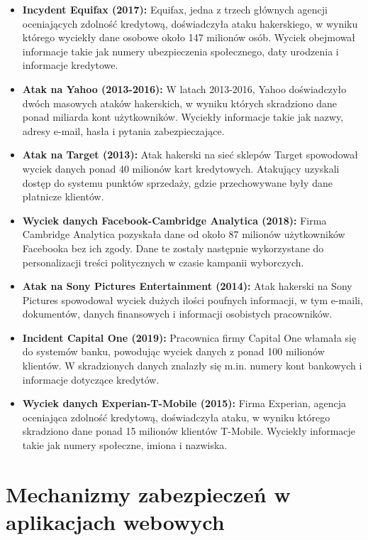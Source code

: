 \documentclass[12pt,twoside]{article}
\begin{document}
\begin{itemize}


\item \textbf{Incydent Equifax (2017):} Equifax, jedna z trzech głównych agencji oceniających zdolność kredytową, doświadczyła ataku hakerskiego, w wyniku którego wyciekły dane osobowe około 147 milionów osób. Wyciek obejmował informacje takie jak numery ubezpieczenia społecznego, daty urodzenia i informacje kredytowe.

\item \textbf{Atak na Yahoo (2013-2016):} W latach 2013-2016, Yahoo doświadczyło dwóch masowych ataków hakerskich, w wyniku których skradziono dane ponad miliarda kont użytkowników. Wyciekły informacje takie jak nazwy, adresy e-mail, hasła i pytania zabezpieczające.


\item \textbf{Atak na Target (2013):} Atak hakerski na sieć sklepów Target spowodował wyciek danych ponad 40 milionów kart kredytowych. Atakujący uzyskali dostęp do systemu punktów sprzedaży, gdzie przechowywane były dane płatnicze klientów.

\item \textbf{Wyciek danych Facebook-Cambridge Analytica (2018):} Firma Cambridge Analytica pozyskała dane od około 87 milionów użytkowników Facebooka bez ich zgody. Dane te zostały następnie wykorzystane do personalizacji treści politycznych w czasie kampanii wyborczych.

\item \textbf{Atak na Sony Pictures Entertainment (2014):} Atak hakerski na Sony Pictures spowodował wyciek dużych ilości poufnych informacji, w tym e-maili, dokumentów, danych finansowych i informacji osobistych pracowników.

\item \textbf{Incident Capital One (2019):} Pracownica firmy Capital One włamała się do systemów banku, powodując wyciek danych z ponad 100 milionów klientów. W skradzionych danych znalazły się m.in. numery kont bankowych i informacje dotyczące kredytów.

\item \textbf{Wyciek danych Experian-T-Mobile (2015):} Firma Experian, agencja oceniająca zdolność kredytową, doświadczyła ataku, w wyniku którego skradziono dane ponad 15 milionów klientów T-Mobile. Wyciekły informacje takie jak numery społeczne, imiona i nazwiska.
\end{itemize}
\section{ Mechanizmy zabezpieczeń w aplikacjach webowych }
\end{document}
